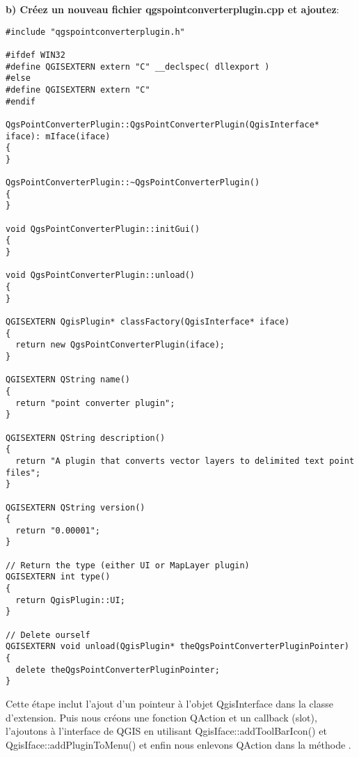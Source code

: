 \textbf{b) Cr\'eez un nouveau fichier qgspointconverterplugin.cpp et ajoutez}:

\begin{verbatim}
#include "qgspointconverterplugin.h"

#ifdef WIN32
#define QGISEXTERN extern "C" __declspec( dllexport )
#else
#define QGISEXTERN extern "C"
#endif

QgsPointConverterPlugin::QgsPointConverterPlugin(QgisInterface* iface): mIface(iface)
{
}

QgsPointConverterPlugin::~QgsPointConverterPlugin()
{
}

void QgsPointConverterPlugin::initGui()
{
}

void QgsPointConverterPlugin::unload()
{
}

QGISEXTERN QgisPlugin* classFactory(QgisInterface* iface)
{
  return new QgsPointConverterPlugin(iface);
}

QGISEXTERN QString name()
{
  return "point converter plugin";
}

QGISEXTERN QString description()
{
  return "A plugin that converts vector layers to delimited text point files";
}

QGISEXTERN QString version()
{
  return "0.00001";
}

// Return the type (either UI or MapLayer plugin)
QGISEXTERN int type()
{
  return QgisPlugin::UI;
}

// Delete ourself
QGISEXTERN void unload(QgisPlugin* theQgsPointConverterPluginPointer)
{
  delete theQgsPointConverterPluginPointer;
}
\end{verbatim}


Cette \'etape inclut l'ajout d'un pointeur \`a l'objet QgisInterface dans la classe 
d'extension. Puis nous cr\'eons une fonction QAction et un callback (slot), 
l'ajoutons \`a l'interface de QGIS en utilisant  QgisIface::addToolBarIcon() et
 QgisIface::addPluginToMenu() et enfin nous enlevons QAction dans la m\'ethode 
 .

